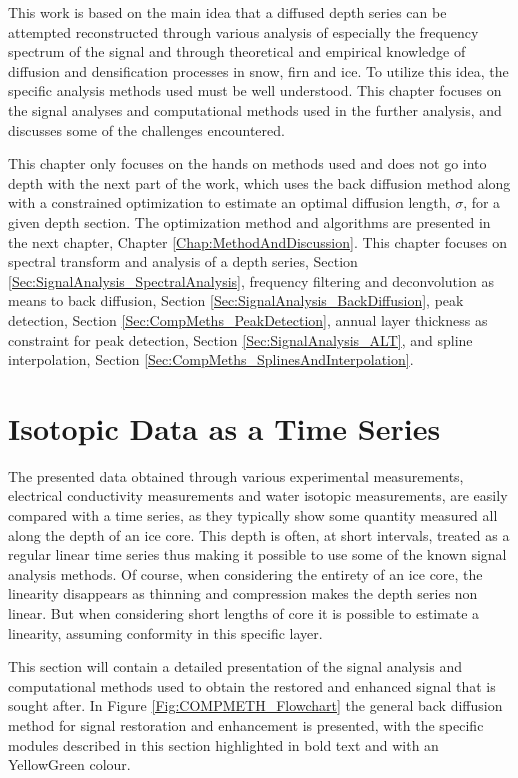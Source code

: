 \documentclass[../../CompleteThesis2/Complete_2ndDraft]{subfiles}
\begin{document}
This work is based on the main idea that a diffused depth series can be attempted reconstructed through various analysis of especially the frequency spectrum of the signal and through theoretical and empirical knowledge of diffusion and densification processes in snow, firn and ice. To utilize this idea, the specific analysis methods used must be well understood. This chapter focuses on the signal analyses and computational methods used in the further analysis, and discusses some of the challenges encountered. 

\minitoc
This chapter only focuses on the hands on methods used and does not go into depth with the next part of the work, which uses the back diffusion method along with a constrained optimization to estimate an optimal diffusion length, $\sigma$, for a given depth section. The optimization method and algorithms are presented in the next chapter, Chapter \ref{Chap:MethodAndDiscussion}. This chapter focuses on spectral transform and analysis of a depth series, Section \ref{Sec:SignalAnalysis_SpectralAnalysis}, frequency filtering and deconvolution as means to back diffusion, Section \ref{Sec:SignalAnalysis_BackDiffusion}, peak detection, Section \ref{Sec:CompMeths_PeakDetection}, annual layer thickness as constraint for peak detection, Section \ref{Sec:SignalAnalysis_ALT}, and spline interpolation, Section \ref{Sec:CompMeths_SplinesAndInterpolation}.

\section[Data as a Time Series]{Isotopic Data as a Time Series}
The presented data obtained through various experimental measurements, electrical conductivity measurements and water isotopic measurements, are easily compared with a time series, as they typically show some quantity measured all along the depth of an ice core. This depth is often, at short intervals, treated as a regular linear time series thus making it possible to use some of the known signal analysis methods. Of course, when considering the entirety of an ice core, the linearity disappears as thinning and compression makes the depth series non linear. But when considering short lengths of core it is possible to estimate a linearity, assuming conformity in this specific layer. 

This section will contain a detailed presentation of the signal analysis and computational methods used to obtain the restored and enhanced signal that is sought after. In Figure \ref{Fig:COMPMETH_Flowchart} the general back diffusion method for signal restoration and enhancement is presented, with the specific modules described in this section highlighted in bold text and with an YellowGreen colour.
\end{document}
